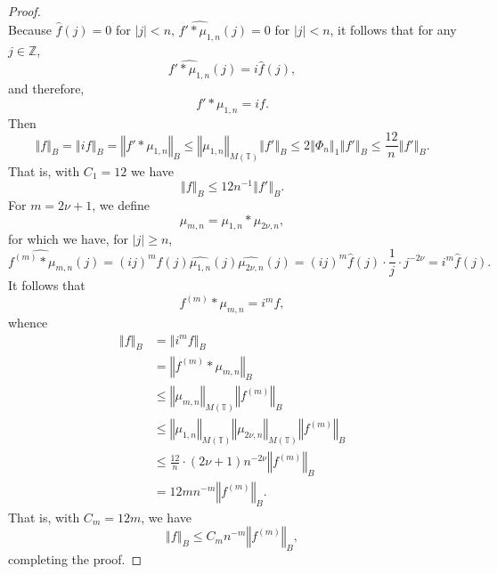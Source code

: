 \documentclass{article}
\newcommand{\norm}[1]{\left\Vert #1 \right\Vert}
\theoremstyle{definition}
\begin{document}
\begin{proof}
\[\]
Because $\hat{f}(j)=0$ for $|j|<n$, 
$\widehat{f'*\mu_{1,n}}(j) =0$ for $|j|<n$, it follows that for any $j \in \mathbb{Z}$,
\[
\widehat{f'*\mu_{1,n}}(j) = i \hat{f}(j),
\]
and therefore,
\[
f'*\mu_{1,n} = if.
\]
Then
\[
\norm{f}_B = \norm{if}_B = \norm{f'*\mu_{1,n}}_B \leq 
\norm{\mu_{1,n}}_{M(\mathbb{T})} \norm{f'}_B
\leq 2 \norm{\Phi_n}_1 \norm{f'}_B
\leq \frac{12}{n} \norm{f'}_B.
\]
That is, with $C_1=12$ we have
\[
\norm{f}_B \leq 12 n^{-1} \norm{f'}_B.
\]
For $m=2\nu+1$, we define 
\[
\mu_{m,n} = \mu_{1,n}*\mu_{2\nu,n},
\]
for which we have, for $|j| \geq n$,
\[
\widehat{f^{(m)} *\mu_{m,n}}(j) = 
(ij)^m \hat{f}(j) \widehat{\mu_{1,n}}(j) \widehat{\mu_{2\nu,n}}(j)
=(ij)^m \hat{f}(j) \cdot \frac{1}{j} \cdot j^{-2\nu}
=i^m \hat{f}(j).
\]
It follows that 
\[
f^{(m)}*\mu_{m,n} = i^m f,
\]
whence
\begin{align*}
\norm{f}_B &= \norm{i^m f}_B \\
&= \norm{f^{(m)}*\mu_{m,n}}_B\\
&\leq \norm{\mu_{m,n}}_{M(\mathbb{T})} \norm{f^{(m)}}_B\\
&\leq \norm{\mu_{1,n}}_{M(\mathbb{T})}
\norm{\mu_{2\nu,n}}_{M(\mathbb{T})} 
\norm{f^{(m)}}_B\\
&\leq \frac{12}{n} \cdot (2\nu+1)n^{-2\nu} \norm{f^{(m)}}_B\\
&=12mn^{-m}  \norm{f^{(m)}}_B.
\end{align*}
That is, with $C_m=12m$, we have
\[
\norm{f}_B \leq C_m n^{-m} \norm{f^{(m)}}_B,
\]
completing the proof.
\end{proof}
\end{document}
